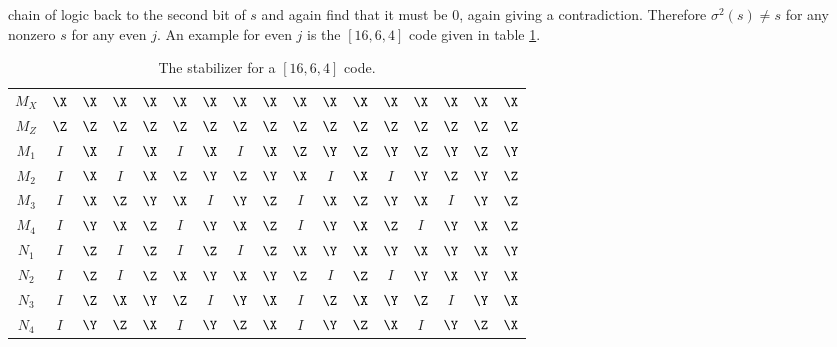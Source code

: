 chain of logic back to the second bit of $s$ and again find that it must be
$0$, again giving a contradiction.  Therefore $\sigma^2 (s) \neq s$ for any
nonzero $s$ for any even $j$.  An example for even $j$ is the $[16,6,4]$ code
given in table \ref{table-16qubit-dist4}.
\begin{table}
	\centering
	{\setlength{\tabcolsep}{0.4em}
		\begin{tabular}{c|cccccccccccccccc}
			$M_X$ & $\X$ & $\X$ & $\X$ & $\X$ & $\X$ & $\X$ & $\X$ & $\X$ & $\X$
			& $\X$ & $\X$ & $\X$ & $\X$ & $\X$ & $\X$ & $\X$ \\
			$M_Z$ & $\Z$ & $\Z$ & $\Z$ & $\Z$ & $\Z$ & $\Z$ & $\Z$ & $\Z$ & $\Z$ &
			$\Z$ & $\Z$ & $\Z$ & $\Z$ & $\Z$ & $\Z$ & $\Z$ \\
			$M_1$ & $I$ & $\X$ & $I$ & $\X$ & $I$ & $\X$ & $I$ & $\X$ & $\Z$ &
			$\Y$ & $\Z$ & $\Y$ & $\Z$ & $\Y$ & $\Z$ & $\Y$ \\
			$M_2$ & $I$ & $\X$ & $I$ & $\X$ & $\Z$ & $\Y$ & $\Z$ & $\Y$ & $\X$ &
			$I$ & $\X$ & $I$ & $\Y$ & $\Z$ & $\Y$ & $\Z$ \\
			$M_3$ & $I$ & $\X$ & $\Z$ & $\Y$ & $\X$ & $I$ & $\Y$ & $\Z$ & $I$ &
			$\X$ & $\Z$ & $\Y$ & $\X$ & $I$ & $\Y$ & $\Z$ \\
			$M_4$ & $I$ & $\Y$ & $\X$ & $\Z$ & $I$ & $\Y$ & $\X$ & $\Z$ & $I$ &
			$\Y$ & $\X$ & $\Z$ & $I$ & $\Y$ & $\X$ & $\Z$ \\
			$N_1$ & $I$ & $\Z$ & $I$ & $\Z$ & $I$ & $\Z$ & $I$ & $\Z$ & $\X$ & $\Y$
			& $\X$ & $\Y$ & $\X$ & $\Y$ & $\X$ & $\Y$ \\
			$N_2$ & $I$ & $\Z$ & $I$ & $\Z$ & $\X$ & $\Y$ & $\X$ & $\Y$ & $\Z$ &
			$I$ & $\Z$ & $I$ & $\Y$ & $\X$ & $\Y$ & $\X$ \\
			$N_3$ & $I$ & $\Z$ & $\X$ & $\Y$ & $\Z$ & $I$ & $\Y$ & $\X$ & $I$ &
			$\Z$ & $\X$ & $\Y$ & $\Z$ & $I$ & $\Y$ & $\X$ \\
			$N_4$ & $I$ & $\Y$ & $\Z$ & $\X$ & $I$ & $\Y$ & $\Z$ & $\X$ & $I$ &
			$\Y$ & $\Z$ & $\X$ & $I$ & $\Y$ & $\Z$ & $\X$
		\end{tabular}
		\caption{The stabilizer for a $[16,6,4]$ code.}
		\label{table-16qubit-dist4}}
\end{table}


